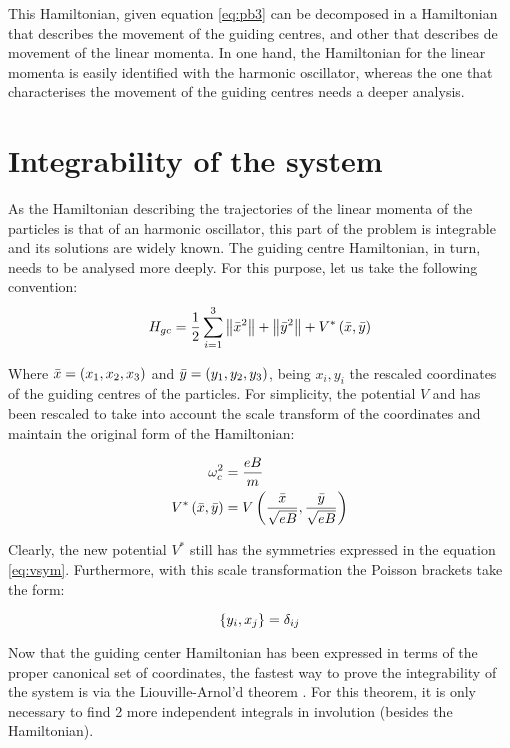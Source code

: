 This Hamiltonian, given equation \eqref{eq:pb3} can be decomposed in a Hamiltonian that describes the movement of the guiding centres, and other that describes de movement of the linear momenta. In one hand, the Hamiltonian for the linear momenta is easily identified with the harmonic oscillator, whereas the one that characterises the movement of the guiding centres needs a deeper analysis.

\section{Integrability of the system}
As the Hamiltonian describing the trajectories of the linear momenta of the particles is that of an harmonic oscillator, this part of the problem is integrable and its solutions are widely known. The guiding centre Hamiltonian, in turn, needs to be analysed more deeply. For this purpose, let us take the following convention:\\


\begin{equation}
H_{gc} = \frac{1}{2} \sum_{i=1}^{3} \left\lVert \bar{x}^2 \right\rVert + \left\lVert \bar{y}^2 \right\rVert
+ V^*\left( \bar{x},\bar{y} \right)
\label{eq:hamgc}
\end{equation}

Where $\bar{x} = \left( x_1,x_2,x_3 \right)$ and $\bar{y} = \left( y_1,y_2,y_3 \right)$, being $x_i,y_i$ the rescaled coordinates of the guiding centres of the particles. For simplicity, the potential $V$ and has been rescaled to take into account the scale transform of the coordinates and maintain the original form of the Hamiltonian:

\begin{align*}
\omega_c^2 &= \frac{eB}{m}\\
V^*\left( \bar{x},\bar{y} \right) &= V\left( \frac{\bar{x}}{\sqrt{eB}},\frac{\bar{y}}{\sqrt{eB}} \right)
\end{align*}

Clearly, the new potential $V^*$ still has the symmetries expressed in the equation \eqref{eq:vsym}. Furthermore, with this scale transformation the Poisson brackets take the form:

\begin{equation}
\left\lbrace y_i, x_j \right\rbrace = \delta_{ij}
\label{lastpb}
\end{equation}

Now that the guiding center Hamiltonian has been expressed in terms of the proper canonical set of coordinates, the fastest way to prove the integrability of the system is via the Liouville-Arnol'd theorem \cite[Sect. 49]{scheck}. For this theorem, it is only necessary to find 2 more independent integrals in involution (besides the Hamiltonian).\\


